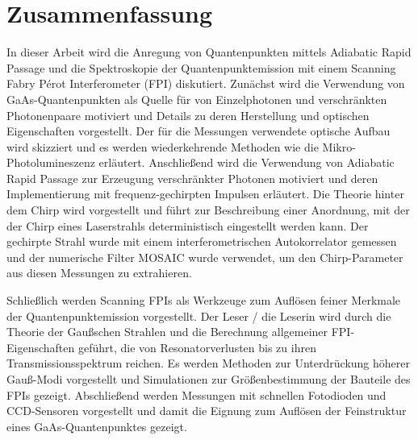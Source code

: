 
\chapter*{Zusammenfassung}
\label{cha:zusammenfassung}


In dieser Arbeit wird die Anregung von Quantenpunkten mittels Adiabatic Rapid Passage und die Spektroskopie der Quantenpunktemission mit einem Scanning Fabry Pérot Interferometer (FPI) diskutiert.
Zunächst wird die Verwendung von GaAs-Quantenpunkten als Quelle für von Einzelphotonen und verschränkten Photonenpaare motiviert und Details zu deren Herstellung und optischen Eigenschaften vorgestellt.
Der für die Messungen verwendete optische Aufbau wird skizziert und es werden wiederkehrende Methoden wie die Mikro-Photolumineszenz erläutert.
Anschließend wird die Verwendung von Adiabatic Rapid Passage zur Erzeugung verschränkter Photonen motiviert und deren Implementierung mit frequenz-gechirpten Impulsen erläutert.
Die Theorie hinter dem Chirp wird vorgestellt und führt zur Beschreibung einer Anordnung, mit der der Chirp eines Laserstrahls deterministisch eingestellt werden kann.
Der gechirpte Strahl wurde mit einem interferometrischen Autokorrelator gemessen und der numerische Filter MOSAIC wurde verwendet, um den Chirp-Parameter aus diesen Messungen zu extrahieren.

Schließlich werden Scanning FPIs als Werkzeuge zum Auflösen feiner Merkmale der Quantenpunktemission vorgestellt.
Der Leser / die Leserin wird durch die Theorie der Gaußschen Strahlen und die Berechnung allgemeiner FPI-Eigenschaften geführt, die von Resonatorverlusten bis zu ihren Transmissionsspektrum reichen.
Es werden Methoden zur Unterdrückung höherer Gauß-Modi vorgestellt und Simulationen zur Größenbestimmung der Bauteile des FPIs gezeigt.
Abschließend werden Messungen mit schnellen Fotodioden und CCD-Sensoren vorgestellt und damit die Eignung zum Auflösen der Feinstruktur eines GaAs-Quantenpunktes gezeigt.

